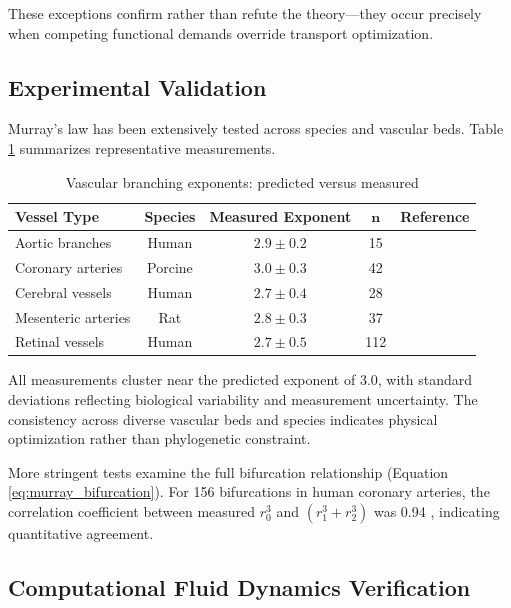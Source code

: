 These exceptions confirm rather than refute the theory—they occur precisely when competing functional demands override transport optimization.

\subsection{Experimental Validation}

Murray's law has been extensively tested across species and vascular beds. Table \ref{tab:murray_validation} summarizes representative measurements.

\begin{table}[h]
\centering
\caption{Vascular branching exponents: predicted versus measured}
\label{tab:murray_validation}
\begin{tabular}{lcccc}
\toprule
\textbf{Vessel Type} & \textbf{Species} & \textbf{Measured Exponent} & \textbf{$\boldsymbol{n}$} & \textbf{Reference} \\
\midrule
Aortic branches & Human & $2.9 \pm 0.2$ & 15 & \cite{zamir1976optimality} \\
Coronary arteries & Porcine & $3.0 \pm 0.3$ & 42 & \cite{kassab1997scaling} \\
Cerebral vessels & Human & $2.7 \pm 0.4$ & 28 & \cite{rossitti1995optimal} \\
Mesenteric arteries & Rat & $2.8 \pm 0.3$ & 37 & \cite{suwa1963estimation} \\
Retinal vessels & Human & $2.7 \pm 0.5$ & 112 & \cite{chapman1996blood} \\
\bottomrule
\end{tabular}
\end{table}

All measurements cluster near the predicted exponent of 3.0, with standard deviations reflecting biological variability and measurement uncertainty. The consistency across diverse vascular beds and species indicates physical optimization rather than phylogenetic constraint.

More stringent tests examine the full bifurcation relationship (Equation \ref{eq:murray_bifurcation}). For 156 bifurcations in human coronary arteries, the correlation coefficient between measured $r_{0}^{3}$ and $(r_{1}^{3} + r_{2}^{3})$ was 0.94 \cite{kassab1997scaling}, indicating quantitative agreement.

\subsection{Computational Fluid Dynamics Verification}

